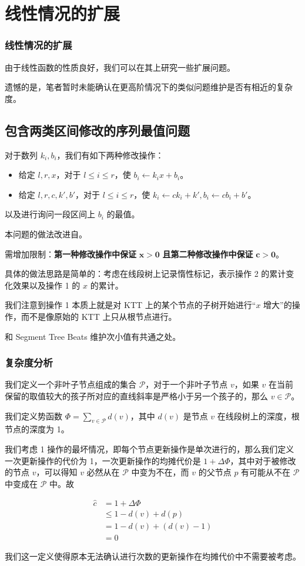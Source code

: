 \documentclass[mathserif]{ctexbeamer}
\begin{document}
\section{线性情况的扩展}

\frame
{
  \frametitle{线性情况的扩展}

  由于线性函数的性质良好，我们可以在其上研究一些扩展问题。
  
  遗憾的是，笔者暂时未能确认在更高阶情况下的类似问题维护是否有相近的复杂度。

}

\subsection{包含两类区间修改的序列最值问题}

\frame
{
  对于数列 $k_i, b_i$，我们有如下两种修改操作：

\begin{itemize}
\item 给定 $l, r, x$，对于 $l\le i\le r$，使 $b_i \leftarrow k_ix + b_i$。
\item 给定 $l, r, c, k', b'$，对于 $l\le i\le r$，使 $k_i \leftarrow ck_i + k', b_i \leftarrow cb_i + b'$。
\end{itemize}

以及进行询问一段区间上 $b_i$ 的最值。

本问题的做法改进自\cite{dzhang}。

需增加限制：\textbf{第一种修改操作中保证} $\mathbf{x > 0}$ \textbf{且第二种修改操作中保证} $\mathbf{c > 0}$。
}

\frame
{
  具体的做法思路是简单的：考虑在线段树上记录惰性标记，表示操作 2 的累计变化效果以及操作 1 的 $x$ 的累计。
  
  我们注意到操作 1 本质上就是对 KTT 上的某个节点的子树开始进行“$x$ 增大”的操作，而不是像原始的 KTT 上只从根节点进行。
  
  和 Segment Tree Beats 维护次小值有共通之处。
}

\frame
{
  \frametitle{复杂度分析}
  
  我们定义一个非叶子节点组成的集合 $\mathcal P$，对于一个非叶子节点 $v$，如果 $v$ 在当前保留的取值较大的孩子所对应的直线斜率是严格小于另一个孩子的，那么 $v\in \mathcal P$。

我们定义势函数 $\Phi = \sum_{v\in \mathcal P} d(v)$，其中 $d(v)$ 是节点 $v$ 在线段树上的深度，根节点的深度为 1。
}

\frame
{
  我们考虑 1 操作的最坏情况，即每个节点更新操作是单次进行的，那么我们定义一次更新操作的代价为 1，一次更新操作的均摊代价是 $1 + \Delta\Phi$，其中对于被修改的节点 $v$，可以得知 $v$ 必然从在 $\mathcal P$ 中变为不在，而 $v$ 的父节点 $p$ 有可能从不在 $\mathcal P$ 中变成在 $\mathcal P$ 中。故

\begin{align*}
\widehat c &= 1 + \Delta \Phi\\
&\le 1 - d(v) + d(p) \\
&= 1 - d(v) + (d(v) - 1)\\
&= 0
\end{align*}

我们这一定义使得原本无法确认进行次数的更新操作在均摊代价中不需要被考虑。

}
\end{document}
